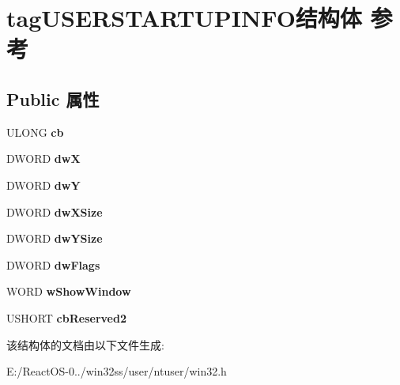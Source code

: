 \hypertarget{structtag_u_s_e_r_s_t_a_r_t_u_p_i_n_f_o}{}\section{tag\+U\+S\+E\+R\+S\+T\+A\+R\+T\+U\+P\+I\+N\+F\+O结构体 参考}
\label{structtag_u_s_e_r_s_t_a_r_t_u_p_i_n_f_o}
\subsection*{Public 属性}
\begin{DoxyCompactItemize}
\item 
\mbox{\label{structtag_u_s_e_r_s_t_a_r_t_u_p_i_n_f_o_a19a9e24fa233772b1f9e719f400d3b4a}} 
U\+L\+O\+NG {\bfseries cb}
\item 
\mbox{\label{structtag_u_s_e_r_s_t_a_r_t_u_p_i_n_f_o_a1a9e22c3d194bd7f3188aeb6f23bce39}} 
D\+W\+O\+RD {\bfseries dwX}
\item 
\mbox{\label{structtag_u_s_e_r_s_t_a_r_t_u_p_i_n_f_o_ac930fb2e85932f2afe40fedd86e43a32}} 
D\+W\+O\+RD {\bfseries dwY}
\item 
\mbox{\label{structtag_u_s_e_r_s_t_a_r_t_u_p_i_n_f_o_a7786e6cd71a5f76f6d1788ab472104de}} 
D\+W\+O\+RD {\bfseries dw\+X\+Size}
\item 
\mbox{\label{structtag_u_s_e_r_s_t_a_r_t_u_p_i_n_f_o_a3b62e6718c7e5b2c518a862ea315cb54}} 
D\+W\+O\+RD {\bfseries dw\+Y\+Size}
\item 
\mbox{\label{structtag_u_s_e_r_s_t_a_r_t_u_p_i_n_f_o_aa2f195f03f43a509ce5415fb97b35eee}} 
D\+W\+O\+RD {\bfseries dw\+Flags}
\item 
\mbox{\label{structtag_u_s_e_r_s_t_a_r_t_u_p_i_n_f_o_a8cd4cc4f78e3e763da46314e70d9f98b}} 
W\+O\+RD {\bfseries w\+Show\+Window}
\item 
\mbox{\label{structtag_u_s_e_r_s_t_a_r_t_u_p_i_n_f_o_ac4e06e12344f4270ee834dfae1e06991}} 
U\+S\+H\+O\+RT {\bfseries cb\+Reserved2}
\end{DoxyCompactItemize}


该结构体的文档由以下文件生成\+:\begin{DoxyCompactItemize}
\item 
E\+:/\+React\+O\+S-\/0../win32ss/user/ntuser/win32.\+h\end{DoxyCompactItemize}

